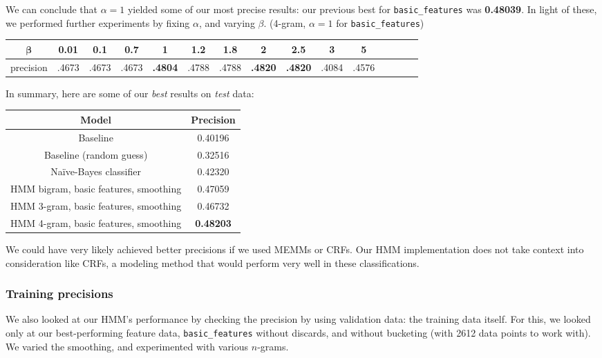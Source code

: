 \documentclass{article}
\begin{document}
We can conclude that $\alpha = 1$ yielded some of our most precise results: our previous best for \texttt{basic\_features} was \textbf{0.48039}. In light of these, we performed further experiments by fixing $\alpha$, and varying $\beta$. (4-gram, $\alpha = 1$ for \texttt{basic\_features})\par\bigskip

{\small\begin{tabular}{|c|c|c|c|c|c|c|c|c|c|c|c|c|c|c|}\hline
$\bm{\beta}$ & 0.01 & 0.1 & 0.7 & 1 & 1.2 & 1.8 & 2 & 2.5 & 3 & 5\\\hline
precision & .4673 & .4673 & .4673 & \textbf{.4804} & .4788 & .4788
& \textbf{.4820} & \textbf{.4820} & .4084 & .4576\\\hline
\end{tabular}}\par\bigskip

In summary, here are some of our \emph{best} results on \emph{test} data:\par\bigskip
\begin{tabular}{|c|c|}\hline
Model                      & Precision\\\hline
Baseline                   & 0.40196\\
Baseline (random guess)    & 0.32516\\
Na\"{i}ve-Bayes classifier & 0.42320\\
HMM bigram, basic features, smoothing & 0.47059\\
HMM 3-gram, basic features, smoothing & 0.46732\\
HMM 4-gram, basic features, smoothing & \textbf{0.48203}\\\hline
\end{tabular}\par\medskip

We could have very likely achieved better precisions if we used MEMMs or CRFs. Our HMM implementation does not take context into consideration like CRFs, a modeling method that would perform very well in these classifications.

\subsubsection{Training precisions}
We also looked at our HMM's performance by checking the precision by using validation data: the training data itself. For this, we looked only at our best-performing feature data, \texttt{basic\_features} without discards, and without bucketing (with 2612 data points to work with). We varied the smoothing, and experimented with various $n$-grams.\par\medskip
\end{document}
